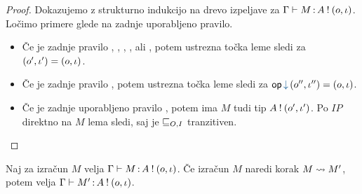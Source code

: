 \begin{proof}
	Dokazujemo z strukturno indukcijo na drevo izpeljave za $\Gamma \vdash M \mathinner{:} A \mathbin{!} (o, \iota)$.
	Ločimo primere glede na zadnje uporabljeno pravilo.
	
	\begin{itemize}
		\item Če je zadnje pravilo , , , ,  ali , potem ustrezna točka leme sledi za $(o', \iota') = (o, \iota)$.
		
		\item Če je zadnje pravilo , potem ustrezna točka leme sledi za $\opincomp{op}{(\o'', \i'')} = (\o, \i)$.
		
		\item Če je zadnje uporabljeno pravilo , potem ima $M$ tudi tip $A \mathbin{!} (o', \iota')$. Po $IP$ direktno na $M$ lema sledi, saj je $\sqsubseteq_{O, I}$ tranzitiven.
	\end{itemize}
\end{proof}

\begin{trditev}[o ohranitvi]\label{trd:ohranitev-izracuni}
	Naj za izračun $M$ velja $\Gamma \vdash M \mathinner{:} A \mathbin{!} (o, \iota)$. Če izračun $M$ naredi korak $M \leadsto M'$, potem velja $\Gamma \vdash M' \mathinner{:} A \mathbin{!} (o, \iota)$.
\end{trditev}

